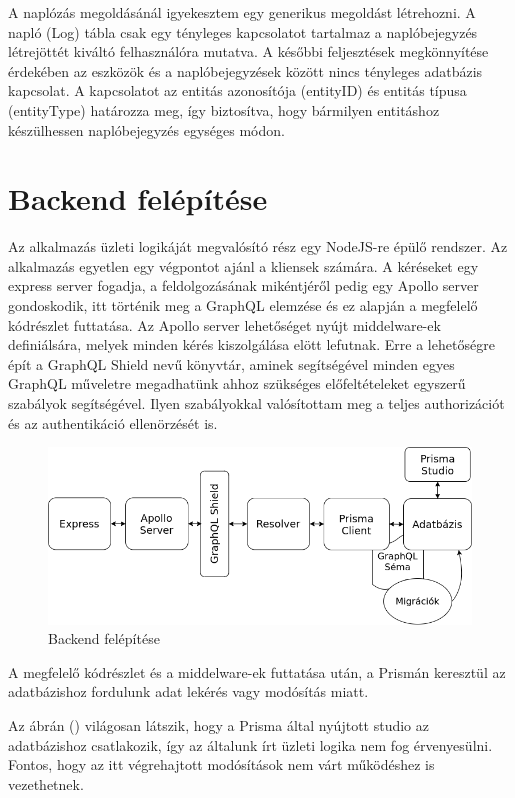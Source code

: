 A naplózás megoldásánál igyekesztem egy generikus megoldást létrehozni.
A napló (Log) tábla csak egy tényleges kapcsolatot tartalmaz a naplóbejegyzés létrejöttét kiváltó felhasználóra mutatva.
A későbbi feljesztések megkönnyítése érdekében az eszközök és a naplóbejegyzések között nincs tényleges adatbázis kapcsolat.
A kapcsolatot az entitás azonosítója (entityID) és entitás típusa (entityType) határozza meg, így biztosítva, hogy bármilyen entitáshoz készülhessen naplóbejegyzés egységes módon.

\section{Backend felépítése}
Az alkalmazás üzleti logikáját megvalósító rész egy NodeJS-re épülő rendszer.
Az alkalmazás egyetlen egy végpontot ajánl a kliensek számára.
A kéréseket egy express server fogadja, a feldolgozásának mikéntjéről pedig egy Apollo server gondoskodik, itt történik meg a GraphQL elemzése és ez alapján a megfelelő kódrészlet futtatása.
Az Apollo server lehetőséget nyújt middelware-ek definiálsára, melyek minden kérés kiszolgálása elött lefutnak.
Erre a lehetőségre épít a GraphQL Shield nevű könyvtár, aminek segítségével minden egyes GraphQL műveletre megadhatünk ahhoz szükséges előfeltételeket egyszerű szabályok segítségével.
Ilyen szabályokkal valósítottam meg a teljes authorizációt és az authentikáció ellenörzését is.

\begin{figure}[!ht]
  \centering
  \includegraphics[width=150mm, keepaspectratio]{figures/backend.png}
  \caption{Backend felépítése}
  \label{fig:backend}
\end{figure}

A megfelelő kódrészlet és a middelware-ek futtatása után, a Prismán keresztül az adatbázishoz fordulunk adat lekérés vagy modósítás miatt.

Az ábrán () világosan látszik, hogy a Prisma által nyújtott studio az adatbázishoz csatlakozik, így az általunk írt üzleti logika nem fog érvenyesülni.
Fontos, hogy az itt végrehajtott modósítások nem várt működéshez is vezethetnek.

